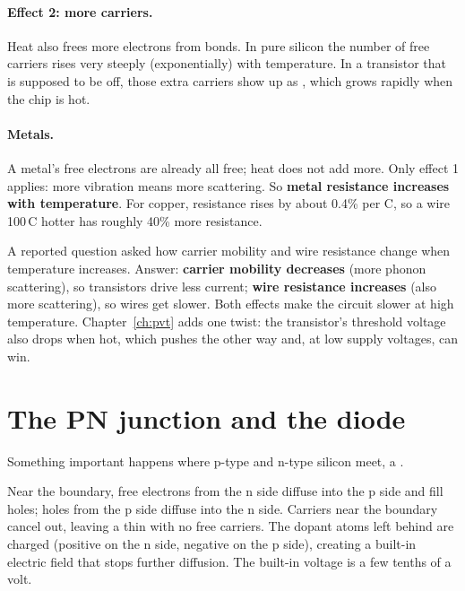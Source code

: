 \paragraph{Effect 2: more carriers.} Heat also frees more electrons from bonds. In pure silicon the number of free carriers rises very steeply (exponentially) with temperature. In a transistor that is supposed to be off, those extra carriers show up as , which grows rapidly when the chip is hot.

\paragraph{Metals.} A metal's free electrons are already all free; heat does not add more. Only effect 1 applies: more vibration means more scattering. So \textbf{metal resistance increases with temperature}. For copper, resistance rises by about 0.4\% per \textdegree C, so a wire 100\,\textdegree C hotter has roughly 40\% more resistance.

\begin{onoa}
A reported question asked how carrier mobility and wire resistance change when temperature increases. Answer: \textbf{carrier mobility decreases} (more phonon scattering), so transistors drive less current; \textbf{wire resistance increases} (also more scattering), so wires get slower. Both effects make the circuit slower at high temperature. Chapter~\ref{ch:pvt} adds one twist: the transistor's threshold voltage also drops when hot, which pushes the other way and, at low supply voltages, can win.
\end{onoa}

\section{The PN junction and the diode}
\label{sec:pn}

Something important happens where p-type and n-type silicon meet, a .

Near the boundary, free electrons from the n side diffuse into the p side and fill holes; holes from the p side diffuse into the n side. Carriers near the boundary cancel out, leaving a thin  with no free carriers. The dopant atoms left behind are charged (positive on the n side, negative on the p side), creating a built-in electric field that stops further diffusion. The built-in voltage is a few tenths of a volt.

